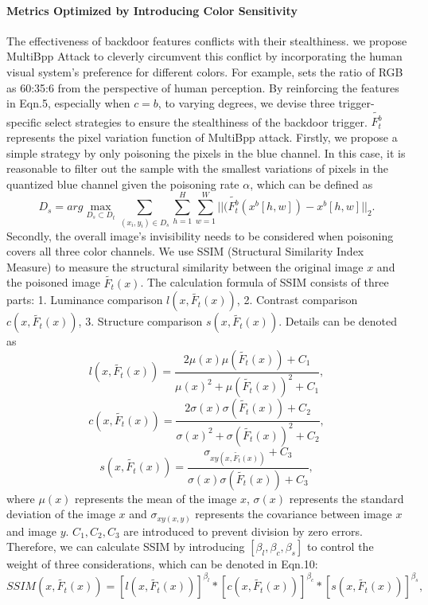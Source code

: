 \documentclass{article}
\begin{document}
\paragraph{Metrics Optimized by Introducing Color Sensitivity}
The effectiveness of backdoor features conflicts with their stealthiness. we propose MultiBpp Attack to cleverly circumvent this conflict by incorporating the human visual system's preference for different colors. For example, \citet{land1971lightness} sets the ratio of RGB as 60:35:6 from the perspective of human perception. By reinforcing the features in Eqn.5, especially when \(c = b\), to varying degrees, we devise three trigger-specific select strategies to ensure the stealthiness of the backdoor trigger. \(\tilde{F_t^{b}}\) represents the pixel variation function of MultiBpp attack. Firstly, we propose a simple strategy by only poisoning the pixels in the blue channel. In this case, it is reasonable to filter out the sample with the smallest variations of pixels in the quantized blue channel given the poisoning rate \(\alpha\), which can be defined as
\begin{equation}
 D_s = arg \max_{D_s\subset D_t}\sum_{(x_i,y_i) \in D_s}\sum_{h=1}^{H}\sum_{w=1}^{W}||(\tilde{F_t^{b}}(x^b[h,w]) - x^b[h,w]||_2.
\end{equation}
Secondly, the overall image's invisibility needs to be considered when poisoning covers all three color channels. We use SSIM (Structural Similarity Index Measure) to measure the structural similarity between the original image \(x\) and the poisoned image \(\tilde{F_t}(x)\). The calculation formula of SSIM consists of three parts: 1. Luminance comparison \(l(x, \tilde{F_t}(x))\), 2. Contrast comparison \(c(x, \tilde{F_t}(x))\), 3. Structure comparison \(s(x, \tilde{F_t}(x))\). Details can be denoted as
\begin{equation}
l(x,\tilde{F_t}(x)) = \frac{2\mu(x)\mu(\tilde{F_t}(x)) + C_1}{\mu(x)^2 + \mu(\tilde{F_t}(x))^2 + C_1},
\end{equation}
\begin{equation}
c(x,\tilde{F_t}(x)) = \frac{2\sigma(x)\sigma(\tilde{F_t}(x)) + C_2}{\sigma(x)^2 + \sigma(\tilde{F_t}(x))^2 + C_2},
\end{equation}
\begin{equation}
s(x,\tilde{F_t}(x)) = \frac{\sigma_{xy(x,\tilde{F_t}(x))} + C_3}{\sigma(x)\sigma(\tilde{F_t}(x)) + C_3},
\end{equation}
where \(\mu(x)\) represents the mean of the image \(x\), \(\sigma(x)\) represents the standard deviation of the image \(x\) and \(\sigma_{xy(x,y)}\) represents the covariance between image \(x\) and image \(y\). \(C_1,C_2,C_3\) are introduced to prevent division by zero errors. Therefore, we can calculate SSIM by introducing \([\beta_l, \beta_c, \beta_s]\) to control the weight of three considerations, which can be denoted in Eqn.10:
\begin{equation}
SSIM(x,\tilde{F_t}(x)) = [l(x,\tilde{F_t}(x))]^{\beta_l} * [c(x,\tilde{F_t}(x))]^{\beta_c} * [s(x,\tilde{F_t}(x))]^{\beta_s},
\end{equation}
\end{document}
